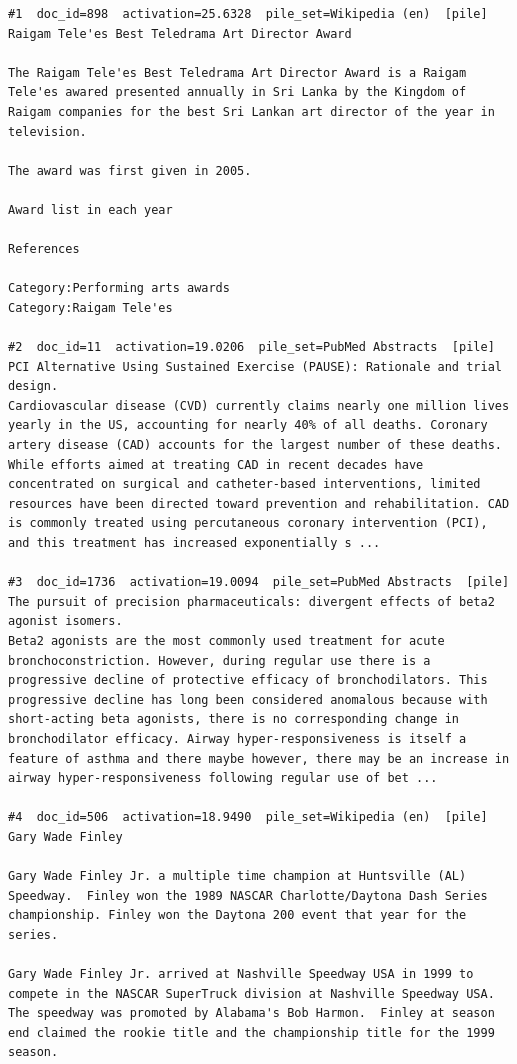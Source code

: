\begin{verbatim}
#1  doc_id=898  activation=25.6328  pile_set=Wikipedia (en)  [pile]
Raigam Tele'es Best Teledrama Art Director Award

The Raigam Tele'es Best Teledrama Art Director Award is a Raigam Tele'es awared presented annually in Sri Lanka by the Kingdom of Raigam companies for the best Sri Lankan art director of the year in television.

The award was first given in 2005.

Award list in each year

References

Category:Performing arts awards
Category:Raigam Tele'es

#2  doc_id=11  activation=19.0206  pile_set=PubMed Abstracts  [pile]
PCI Alternative Using Sustained Exercise (PAUSE): Rationale and trial design.
Cardiovascular disease (CVD) currently claims nearly one million lives yearly in the US, accounting for nearly 40% of all deaths. Coronary artery disease (CAD) accounts for the largest number of these deaths. While efforts aimed at treating CAD in recent decades have concentrated on surgical and catheter-based interventions, limited resources have been directed toward prevention and rehabilitation. CAD is commonly treated using percutaneous coronary intervention (PCI), and this treatment has increased exponentially s ...

#3  doc_id=1736  activation=19.0094  pile_set=PubMed Abstracts  [pile]
The pursuit of precision pharmaceuticals: divergent effects of beta2 agonist isomers.
Beta2 agonists are the most commonly used treatment for acute bronchoconstriction. However, during regular use there is a progressive decline of protective efficacy of bronchodilators. This progressive decline has long been considered anomalous because with short-acting beta agonists, there is no corresponding change in bronchodilator efficacy. Airway hyper-responsiveness is itself a feature of asthma and there maybe however, there may be an increase in airway hyper-responsiveness following regular use of bet ...

#4  doc_id=506  activation=18.9490  pile_set=Wikipedia (en)  [pile]
Gary Wade Finley

Gary Wade Finley Jr. a multiple time champion at Huntsville (AL) Speedway.  Finley won the 1989 NASCAR Charlotte/Daytona Dash Series championship. Finley won the Daytona 200 event that year for the series.

Gary Wade Finley Jr. arrived at Nashville Speedway USA in 1999 to compete in the NASCAR SuperTruck division at Nashville Speedway USA.  The speedway was promoted by Alabama's Bob Harmon.  Finley at season end claimed the rookie title and the championship title for the 1999 season.


\end{verbatim}
